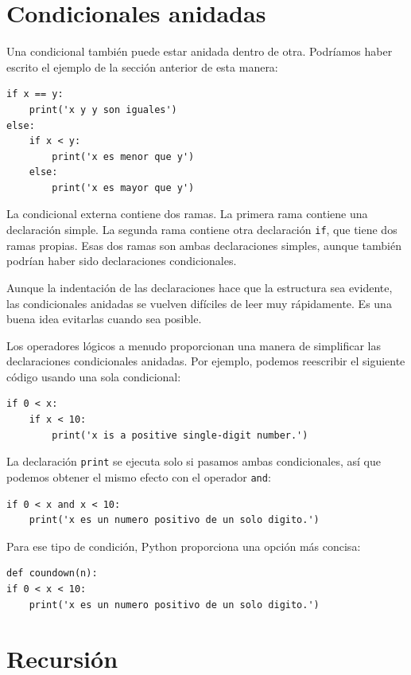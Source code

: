 \section{Condicionales anidadas}

Una condicional también puede estar anidada dentro de otra. Podríamos haber escrito el ejemplo de la sección anterior de esta manera:

\begin{lstlisting}
if x == y:
    print('x y y son iguales')
else:
    if x < y:
        print('x es menor que y')
    else:
        print('x es mayor que y')
\end{lstlisting}

La condicional externa contiene dos ramas. La primera rama contiene una declaración simple. La segunda rama contiene otra declaración \texttt{if}, que tiene dos ramas propias. Esas dos ramas son ambas declaraciones simples, aunque también podrían haber sido declaraciones condicionales.

Aunque la indentación de las declaraciones hace que la estructura sea evidente, las condicionales anidadas se vuelven difíciles de leer muy rápidamente. Es una buena idea evitarlas cuando sea posible.

Los operadores lógicos a menudo proporcionan una manera de simplificar las declaraciones condicionales anidadas. Por ejemplo, podemos reescribir el siguiente código usando una sola condicional:

\begin{lstlisting}
if 0 < x:
    if x < 10:
        print('x is a positive single-digit number.')
\end{lstlisting}

La declaración \texttt{print} se ejecuta solo si pasamos ambas condicionales, así que podemos obtener el mismo efecto con el operador \texttt{and}:

\begin{lstlisting}
if 0 < x and x < 10:
    print('x es un numero positivo de un solo digito.')
\end{lstlisting}

Para ese tipo de condición, Python proporciona una opción más concisa:

\begin{lstlisting}
def coundown(n):
if 0 < x < 10:
    print('x es un numero positivo de un solo digito.')
\end{lstlisting}

\section{Recursión}


